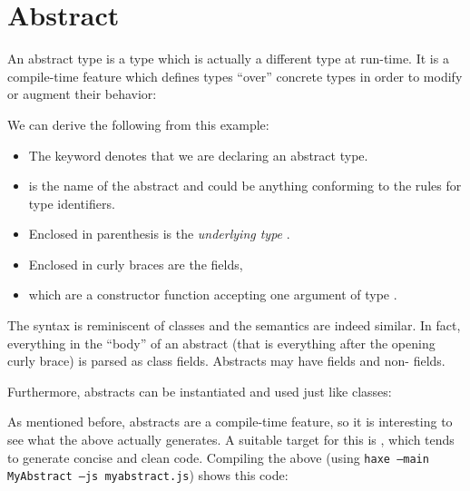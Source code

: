 \section{Abstract}
\label{types-abstract}

An abstract type is a type which is actually a different type at run-time. It is a compile-time feature which defines types ``over'' concrete types in order to modify or augment their behavior:

We can derive the following from this example:

\begin{itemize}
	\item The keyword  denotes that we are declaring an abstract type.
	\item {} is the name of the abstract and could be anything conforming to the rules for type identifiers.
	\item Enclosed in parenthesis \expr{()} is the \emph{underlying type} .
	\item Enclosed in curly braces \expr{$\left\{\right\}$} are the fields,
	\item which are a constructor function  accepting one argument  of type .
\end{itemize}


The syntax is reminiscent of classes and the semantics are indeed similar. In fact, everything in the ``body'' of an abstract (that is everything after the opening curly brace) is parsed as class fields. Abstracts may have  fields and non-  fields.

Furthermore, abstracts can be instantiated and used just like classes:

As mentioned before, abstracts are a compile-time feature, so it is interesting to see what the above actually generates. A suitable target for this is , which tends to generate concise and clean code. Compiling the above (using \texttt{haxe --main MyAbstract --js myabstract.js}) shows this  code:

